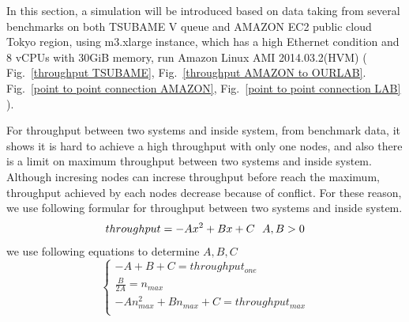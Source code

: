 
In this section, a simulation will be introduced based on data taking from several benchmarks on both TSUBAME V queue and AMAZON EC2 public cloud Tokyo region, using
m3.xlarge instance, which has a high Ethernet condition and 8 vCPUs with 30GiB memory, run Amazon Linux AMI 2014.03.2(HVM) ( Fig.~\ref{throughput TSUBAME}, Fig.~\ref{throughput AMAZON to OURLAB}. Fig.~\ref{point to point connection AMAZON}, Fig.~\ref{point to point connection LAB} ).

	
For throughput between two systems and inside system, from benchmark data, it shows it is hard to achieve a high throughput with only one nodes, and also there is a limit on maximum throughput between two systems and inside system.
Although incresing nodes can increse throughput before reach the maximum, throughput achieved by each nodes decrease because of conflict.
For these reason, we use following formular for throughput between two systems and inside system.
\begin{equation}
throughput=-Ax^2+Bx+C~~ A,B>0\\
\end{equation}
we use following equations to determine $A,B,C$
\begin{equation}
	\label{throughput equation}
\begin{cases}
	-A+B+C=throughput_{one}\\\nonumber
	\frac{B}{2A}=n_{max}\\\nonumber
	-An_{max}^2+Bn_{max}+C=throughput_{max}\\
\end{cases}
\end{equation}


